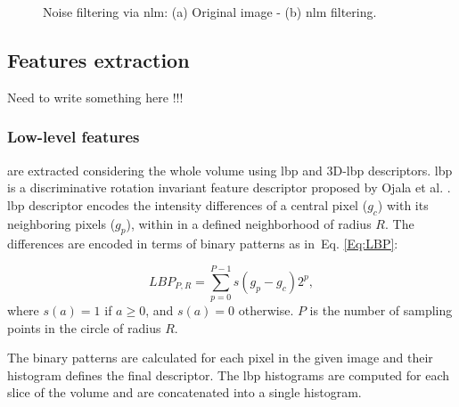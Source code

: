 \begin{figure}
  \centering
  \hspace*{\fill}
   \hfill
  \hspace*{\fill}
  \caption{Noise filtering via \ac{nlm}: (a) Original image - (b) \ac{nlm} filtering.}
  \label{fig:denoise}
\end{figure}

\subsection{Features extraction}
Need to write something here !!!


\subsubsection{Low-level features} are extracted considering the whole volume using \ac{lbp} and 3D-\ac{lbp} descriptors. 
\ac{lbp} is a discriminative rotation invariant feature descriptor proposed by Ojala et al. \cite{ojala2002multiresolution}. 
\ac{lbp} descriptor encodes the intensity differences of a central pixel ($g_c$) with its neighboring pixels ($g_{p}$), within in a defined neighborhood of radius $R$. The differences are encoded in terms of binary patterns as in~Eq. \ref{Eq:LBP}: 

\begin{equation} \label{Eq:LBP}
  LBP_{P,R} = \sum_{p=0}^{P-1}s(g_{p} - g_{c})2^{p},
\end{equation}
where $s(a) = 1$ if $a \geq 0$, and $s(a)=0$ otherwise. $P$ is the number of sampling points in the circle of radius $R$.

The binary patterns are calculated for each pixel in the given image and their histogram defines the final descriptor.
The \ac{lbp} histograms are computed for each slice of the volume and are concatenated into a single histogram.


